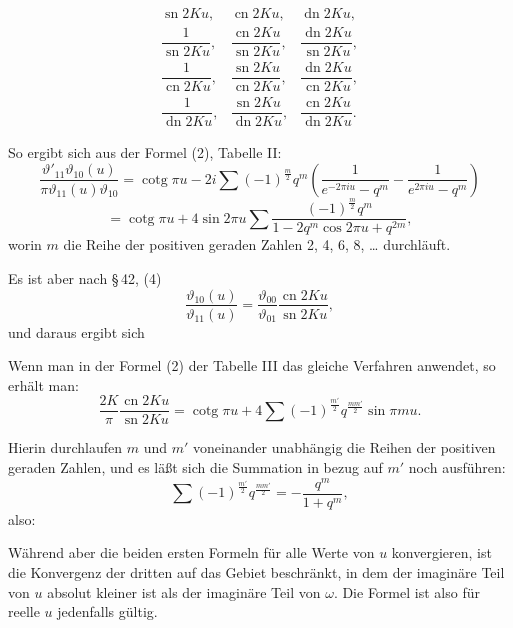 \[
\begin{array}{lll}
\operatorname{sn}2Ku, & \operatorname{cn}2Ku, & \operatorname{dn}2Ku, \\[2mm]
\dfrac{1}{\operatorname{sn}2Ku}, & \dfrac{\operatorname{cn}2Ku}{\operatorname{sn}2Ku}, & \dfrac{\operatorname{dn}2Ku}{\operatorname{sn}2Ku}, \\[2mm]
\dfrac{1}{\operatorname{cn}2Ku}, & \dfrac{\operatorname{sn}2Ku}{\operatorname{cn}2Ku}, & \dfrac{\operatorname{dn}2Ku}{\operatorname{cn}2Ku}, \\[2mm]
\dfrac{1}{\operatorname{dn}2Ku}, & \dfrac{\operatorname{sn}2Ku}{\operatorname{dn}2Ku}, & \dfrac{\operatorname{cn}2Ku}{\operatorname{dn}2Ku}.
\end{array}
\]

So ergibt sich aus der Formel (2), Tabelle II:
\[
\frac{\vartheta'_{11}\vartheta_{10}(u)}{\pi\vartheta_{11}(u)\vartheta_{10}} = \operatorname{cotg}\pi u - 2i\sum(-1)^{\frac{m}{2}}q^m\left(\frac{1}{e^{-2\pi iu}-q^m} - \frac{1}{e^{2\pi iu}-q^m}\right)
\]
\[
= \operatorname{cotg}\pi u + 4\sin 2\pi u\sum\frac{(-1)^{\frac{m}{2}}q^m}{1-2q^m\cos 2\pi u+q^{2m}},
\]
worin $m$ die Reihe der positiven geraden Zahlen 2, 4, 6, 8, \dots{} durchläuft.

Es ist aber nach \S\,42, (4)
\[
\frac{\vartheta_{10}(u)}{\vartheta_{11}(u)} = \frac{\vartheta_{00}}{\vartheta_{01}}\frac{\operatorname{cn}2Ku}{\operatorname{sn}2Ku},
\]
und daraus ergibt sich

Wenn man in der Formel (2) der Tabelle III das gleiche Verfahren anwendet, so erhält man:
\[
\frac{2K}{\pi}\frac{\operatorname{cn}2Ku}{\operatorname{sn}2Ku} = \operatorname{cotg}\pi u + 4\sum(-1)^{\frac{m'}{2}}q^{\frac{mm'}{2}}\sin\pi mu.
\]

Hierin durchlaufen $m$ und $m'$ voneinander unabhängig die Reihen der positiven geraden Zahlen, und es läßt sich die Summation in bezug auf $m'$ noch ausführen:
\[
\sum(-1)^{\frac{m'}{2}}q^{\frac{mm'}{2}} = -\frac{q^m}{1+q^m},
\]
also:

Während aber die beiden ersten Formeln für alle Werte von $u$ konvergieren, ist die Konvergenz der dritten auf das Gebiet beschränkt, in dem der imaginäre Teil von $u$ absolut kleiner ist als der imaginäre Teil von $\omega$. Die Formel ist also für reelle $u$ jedenfalls gültig.
